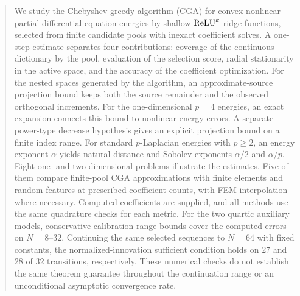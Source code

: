 \begin{abstract}
We study the Chebyshev greedy algorithm (CGA) for convex nonlinear partial differential
equation energies by shallow \(\relu^k\) ridge functions, selected from finite candidate
pools with inexact coefficient solves. A one-step estimate separates four contributions:
coverage of the continuous dictionary by the pool, evaluation of the selection score,
radial stationarity in the active space, and the accuracy of the coefficient optimization.
For the nested spaces generated by the algorithm, an approximate-source projection bound
keeps both the source remainder and the observed orthogonal increments. For the
one-dimensional \(p=4\) energies, an exact expansion connects this bound to nonlinear
energy errors. A separate power-type decrease hypothesis gives an explicit projection
bound on a finite index range. For standard \(p\)-Laplacian energies with \(p\geq2\), an energy
exponent \(\alpha\) yields natural-distance and Sobolev exponents \(\alpha/2\) and
\(\alpha/p\).
Eight one- and two-dimensional problems illustrate the estimates.
Five of them compare finite-pool CGA approximations with finite elements and random
features at prescribed coefficient counts, with FEM interpolation where necessary.
Computed coefficients are supplied, and all methods use the same quadrature checks for each metric.
For the two quartic auxiliary models, conservative calibration-range bounds
cover the computed errors on \(N=8\)--32. Continuing the same selected sequences to
\(N=64\) with fixed constants, the normalized-innovation sufficient condition
holds on 27 and 28 of 32 transitions, respectively. These numerical checks do
not establish the same theorem guarantee throughout the continuation range
or an unconditional asymptotic convergence rate.
\end{abstract}
